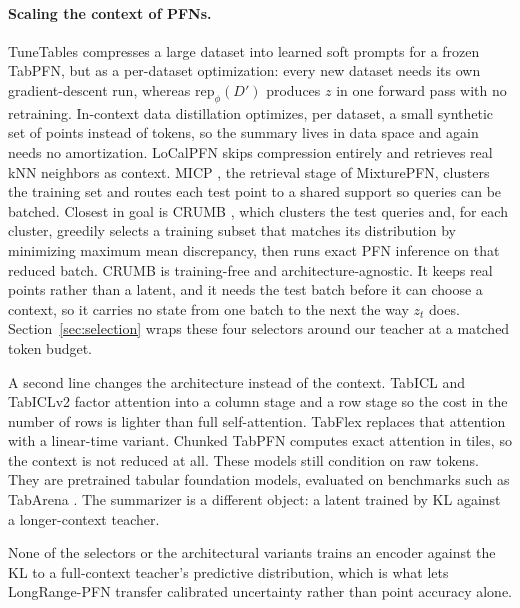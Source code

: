 \documentclass[11pt]{article}
\newcommand{\Dfar}{D'}
\newcommand{\rep}{\mathrm{rep}}
\begin{document}
\paragraph{Scaling the context of PFNs.} TuneTables \citep{feuer2024tunetables}
compresses a large dataset into learned soft prompts for a frozen TabPFN,
but as a per-dataset optimization: every new dataset needs its own
gradient-descent run, whereas $\rep_\phi(\Dfar)$ produces $z$ in one forward
pass with no retraining. In-context data distillation \citep{ma2024icd}
optimizes, per dataset, a small synthetic set of points instead of tokens,
so the summary lives in data space and again needs no amortization.
LoCalPFN \citep{thomas2024localpfn} skips compression entirely and
retrieves real kNN neighbors as context. MICP \citep{xu2024micp}, the
retrieval stage of MixturePFN, clusters the training set and routes each
test point to a shared support so queries can be batched. Closest in goal
is CRUMB \citep{heredge2026crumb}, which clusters the test queries and, for
each cluster, greedily selects a training subset that matches its
distribution by minimizing maximum mean discrepancy, then runs exact PFN
inference on that reduced batch. CRUMB is training-free and
architecture-agnostic. It keeps real points rather than a latent, and it
needs the test batch before it can choose a context, so it carries no
state from one batch to the next the way $z_t$ does. Section~\ref{sec:selection}
wraps these four selectors around our teacher at a matched token budget.

A second line changes the architecture instead of the context.
TabICL and TabICLv2 \citep{qu2025tabicl, qu2026tabiclv2} factor attention
into a column stage and a row stage so the cost in the number of rows is
lighter than full self-attention. TabFlex \citep{zeng2025tabflex} replaces
that attention with a linear-time variant. Chunked TabPFN
\citep{sergazinov2025chunked} computes exact attention in tiles, so the
context is not reduced at all. These models still condition on raw tokens.
They are pretrained tabular foundation models, evaluated on benchmarks such
as TabArena \citep{erickson2025tabarena}. The summarizer is a different
object: a latent trained by KL against a longer-context teacher.

None of the selectors or the architectural variants trains an encoder
against the KL to a full-context teacher's predictive distribution, which
is what lets LongRange-PFN transfer calibrated uncertainty rather than
point accuracy alone.
\end{document}
